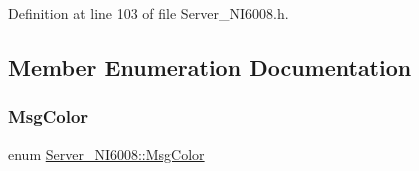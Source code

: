 Definition at line 103 of file Server\+\_\+\+N\+I6008.\+h.



\subsection{Member Enumeration Documentation}
\mbox{\label{classServer__NI6008_abee9aec1c5054cd3223d4a1e5e4a7ad9}} 
\subsubsection{\texorpdfstring{Msg\+Color}{MsgColor}}
{\footnotesize\ttfamily enum \hyperlink{classServer__NI6008_abee9aec1c5054cd3223d4a1e5e4a7ad9}{Server\+\_\+\+N\+I6008\+::\+Msg\+Color}}

